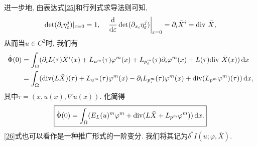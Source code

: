 进一步地, 由表达式\eqref{25}和行列式求导法则可知, 
\begin{equation*}
    \det(\partial_i\eta_{\varepsilon}^j)|_{\varepsilon = 0} = 1, \quad \left.\frac{{\rm d}}{{\rm d}\varepsilon}\det(\partial_{x_i}\eta_{\varepsilon}^j)\right|_{\varepsilon = 0} = \partial_i\bar{X}^i = {\rm div}\ \bar{X},
\end{equation*}
从而当$u \in C^2$时, 我们有
\begin{align*}
    \dot\Phi(0) &= \int_{\Omega}(\partial_iL(\tau)\bar{X}^i(x) + L_{u^m}(\tau) \varphi^m(x) + L_{p^m_i}(\tau)\partial_i\varphi^m(x) + L(\tau){\rm div}\ \bar{X}(x)) \,{\rm d}x \\  
    &= \int_{\Omega}({\rm div}(L\bar{X})(\tau) + L_{u^m}(\tau) \varphi^m(x) - \partial_iL_{p_i^m}(\tau)\varphi^m(x) + {\rm div}(L_{p^m} \varphi^m)(\tau)) \,{\rm d}x,
\end{align*}
其中$\tau = (x, u(x), \nabla u(x))$. 化简得 
\begin{equation}\label{26}
    \boxed{\dot \Phi(0) = \int_{\Omega}(E_L(u)^m\varphi^m + {\rm div}(L \bar{X} + L_{p^m}\varphi^m)) \,{\rm d}x.}
\end{equation}
\eqref{26}式也可以看作是一种推广形式的一阶变分. 我们将其记为$\delta^*I(u; \varphi, \bar{X})$.

